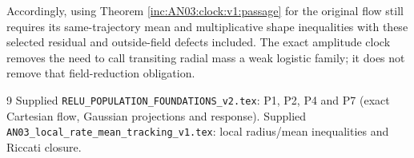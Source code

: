 \documentclass[11pt]{article}
\numberwithin{equation}{section}
\theoremstyle{remark}\newtheorem{remark}[theorem]{Remark}
\begin{document}
Accordingly, using Theorem \ref{inc:AN03:clock:v1:passage} for the original flow still requires its same-trajectory mean and multiplicative shape inequalities with these selected residual and outside-field defects included. The exact amplitude clock removes the need to call transiting radial mass a weak logistic family; it does not remove that field-reduction obligation.

\begin{thebibliography}{9}\small
{} Supplied \texttt{RELU\_POPULATION\_FOUNDATIONS\_v2.tex}: P1, P2, P4 and P7 (exact Cartesian flow, Gaussian projections and response).
 Supplied \texttt{AN03\_local\_rate\_mean\_tracking\_v1.tex}: local radius/mean inequalities and Riccati closure.
\end{thebibliography}
\end{document}

